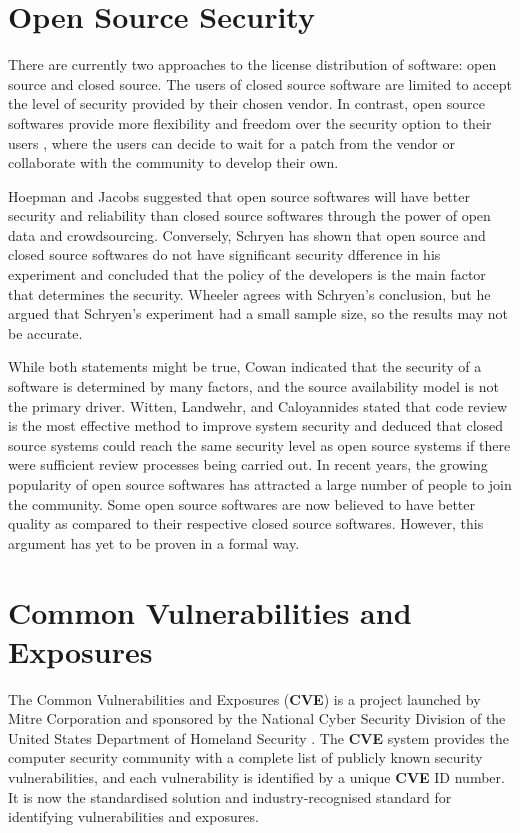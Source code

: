 \documentclass[12pt, a4paper]{report}
\begin{document}
\section{Open Source Security}
There are currently two approaches to the license distribution of software: open source and closed
source. The users of closed source software are limited to accept the level of security
provided by their chosen vendor. In contrast, open source softwares provide more flexibility and
freedom over the security option to their users \cite{payne_2002}, where the users can decide to
wait for a patch from the vendor or collaborate with the community to develop their own.

Hoepman and Jacobs \cite{hoepman_2007} suggested that open source softwares will have better
security and reliability than closed source softwares through the power of open data and
crowdsourcing. Conversely, Schryen \cite{schryen_2011} has shown that open source and closed source
softwares do not have significant security dfference in his experiment and concluded that the policy
of the developers is the main factor that determines the security. Wheeler \cite{wheeler_2015}
agrees with Schryen's conclusion, but he argued that Schryen's experiment had a small sample size,
so the results may not be accurate.

While both statements might be true, Cowan \cite{cowan_2003} indicated that the security of a
software is determined by many factors, and the source availability model is not the primary driver.
Witten, Landwehr, and Caloyannides \cite{witten_2001} stated that code review is the most effective
method to improve system security and deduced that closed source systems could reach the same
security level as open source systems if there were sufficient review processes being carried out.
In recent years, the growing popularity of open source softwares has attracted a large number of
people to join the community. Some open source softwares are now believed to have better quality as
compared to their respective closed source softwares. However, this argument has yet to be proven in
a formal way.

\section{Common Vulnerabilities and Exposures}
The Common Vulnerabilities and Exposures (\textbf{CVE}) is a project launched by Mitre Corporation
and sponsored by the National Cyber Security Division of the United States Department of Homeland
Security \cite{cve}. The \textbf{CVE} system provides the computer security community with a
complete list of publicly known security vulnerabilities, and each vulnerability is identified by a
unique \textbf{CVE} ID number. It is now the standardised solution and industry-recognised standard
for identifying vulnerabilities and exposures.
\end{document}
